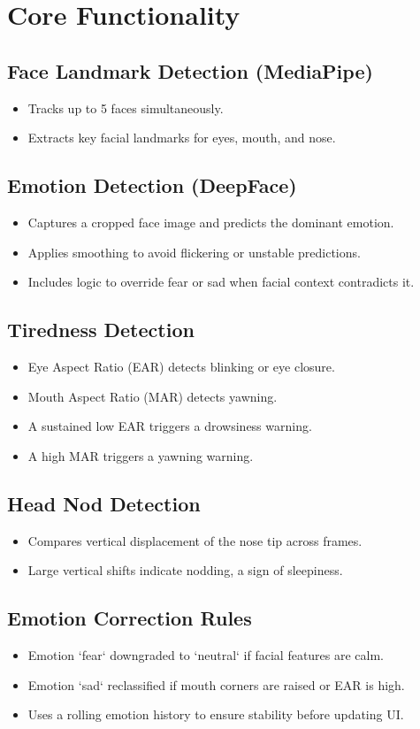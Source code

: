 \documentclass[12pt]{article}
\begin{document}
\section{Core Functionality}
\subsection{Face Landmark Detection (MediaPipe)}
\begin{itemize}
    \item Tracks up to 5 faces simultaneously.
    \item Extracts key facial landmarks for eyes, mouth, and nose.
\end{itemize}
\subsection{Emotion Detection (DeepFace)}
\begin{itemize}
    \item Captures a cropped face image and predicts the dominant emotion.
    \item Applies smoothing to avoid flickering or unstable predictions.
    \item Includes logic to override fear or sad when facial context contradicts it.
\end{itemize}
\subsection{Tiredness Detection}
\begin{itemize}
    \item Eye Aspect Ratio (EAR) detects blinking or eye closure.
    \item Mouth Aspect Ratio (MAR) detects yawning.
    \item A sustained low EAR triggers a drowsiness warning.
    \item A high MAR triggers a yawning warning.
\end{itemize}
\subsection{Head Nod Detection}
\begin{itemize}
    \item Compares vertical displacement of the nose tip across frames.
    \item Large vertical shifts indicate nodding, a sign of sleepiness.
\end{itemize}
\subsection{Emotion Correction Rules}
\begin{itemize}
    \item Emotion `fear` downgraded to `neutral` if facial features are calm.
    \item Emotion `sad` reclassified if mouth corners are raised or EAR is high.
    \item Uses a rolling emotion history to ensure stability before updating UI.
\end{itemize}
\end{document}
